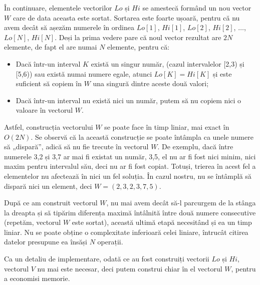 În continuare, elementele vectorilor $Lo$ și $Hi$ se amestecă formând un nou
vector $W$ care de data aceasta este sortat. Sortarea este foarte ușoară,
pentru că nu avem decât să așezăm numerele în ordinea $Lo[1]$, $Hi[1]$,
$Lo[2]$, $Hi[2]$, $\dots$, $Lo[N]$, $Hi[N]$. Deși la prima vedere pare că noul
vector rezultat are $2N$ elemente, de fapt el are numai $N$ elemente, pentru
că:

\begin{itemize}

\item Dacă într-un interval $K$ există un singur număr, (cazul intervalelor
  [2,3) și [5,6)) sau există numai numere egale, atunci $Lo[K] = Hi[K]$ și
      este suficient să copiem în $W$ una singură dintre aceste două valori;

\item Dacă într-un interval nu există nici un număr, putem să nu copiem nici o
  valoare în vectorul $W$.

\end{itemize}

Astfel, construcția vectorului $W$ se poate face în timp liniar, mai exact în
$O(2N)$. Se observă că la această construcție se poate întâmpla ca unele
numere să „dispară”, adică să nu fie trecute în vectorul $W$. De exemplu, dacă
între numerele 3,2 și 3,7 ar mai fi existat un număr, 3,5, el nu ar fi fost
nici minim, nici maxim pentru intervalul său, deci nu ar fi fost
copiat. Totuși, trierea în acest fel a elementelor nu afectează în nici un fel
soluția. În cazul nostru, nu se întâmplă să dispară nici un element, deci $W =
(2, 3,2, 3,7, 5)$.

După ce am construit vectorul $W$, nu mai avem decât să-l parcurgem de la
stânga la dreapta și să tipărim diferența maximă întâlnită între două numere
consecutive (repetăm, vectorul $W$ este sortat), această ultimă etapă
necesitând și ea un timp liniar. Nu se poate obține o complexitate inferioară
celei liniare, întrucât citirea datelor presupune ea însăși $N$ operații.

Ca un detaliu de implementare, odată ce au fost construiți vectorii $Lo$ și
$Hi$, vectorul $V$ nu mai este necesar, deci putem construi chiar în el
vectorul $W$, pentru a economisi memorie.

\inputminted{c}{src/problem18.c}
